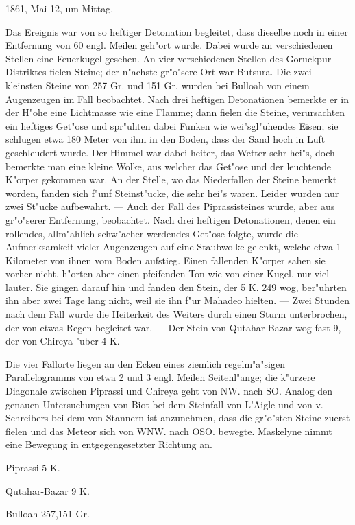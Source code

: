 \documentclass[a4paper, 11pt, oneside]{article}
\begin{document}
1861, Mai 12, um Mittag.

Das Ereignis war von so heftiger Detonation begleitet, dass dieselbe noch in einer Entfernung von 60 engl. Meilen geh"ort wurde. Dabei wurde an verschiedenen Stellen eine Feuerkugel gesehen. An vier verschiedenen Stellen des Goruckpur-Distriktes fielen Steine; der n"achste gr"o"sere Ort war Butsura. Die zwei kleinsten Steine von 257 Gr. und 151 Gr. wurden bei Bulloah von einem Augenzeugen im Fall beobachtet. Nach drei heftigen Detonationen bemerkte er in der H"ohe eine Lichtmasse wie eine Flamme; dann fielen die Steine, verursachten ein heftiges Get"ose und spr"uhten dabei Funken wie wei"sgl"uhendes Eisen; sie schlugen etwa 180 Meter von ihm in den Boden, dass der Sand hoch in Luft geschleudert wurde. Der Himmel war dabei heiter, das Wetter sehr hei"s, doch bemerkte man eine kleine Wolke, aus welcher das Get"ose und der leuchtende K"orper gekommen war. An der Stelle, wo das Niederfallen der Steine bemerkt worden, fanden sich f"unf Steinst"ucke, die sehr hei"s waren. Leider wurden nur zwei St"ucke aufbewahrt. --- Auch der Fall des Piprassisteines wurde, aber aus gr"o"serer Entfernung, beobachtet. Nach drei heftigen Detonationen, denen ein rollendes, allm"ahlich schw"acher werdendes Get"ose folgte, wurde die Aufmerksamkeit vieler Augenzeugen auf eine Staubwolke gelenkt, welche etwa 1 Kilometer von ihnen vom Boden aufstieg. Einen fallenden K"orper sahen sie vorher nicht, h"orten aber einen pfeifenden Ton wie von einer Kugel, nur viel lauter. Sie gingen darauf hin und fanden den Stein, der 5 K. 249 wog, ber"uhrten ihn aber zwei Tage lang nicht, weil sie ihn f"ur Mahadeo hielten. --- Zwei Stunden nach dem Fall wurde die Heiterkeit des Weiters durch einen Sturm unterbrochen, der von etwas Regen begleitet war. --- Der Stein von Qutahar Bazar wog fast 9, der von Chireya "uber 4 K.

Die vier Fallorte liegen an den Ecken eines ziemlich regelm"a"sigen Parallelogramms von etwa 2 und 3 engl. Meilen Seitenl"ange; die k"urzere Diagonale zwischen Piprassi und Chireya geht von NW. nach SO. Analog den genauen Untersuchungen von Biot bei dem Steinfall von L'Aigle und von v. Schreibers bei dem von Stannern ist anzunehmen, dass die gr"o"sten Steine zuerst fielen und das Meteor sich von WNW. nach OSO. bewegte. Maskelyne nimmt eine Bewegung in entgegengesetzter Richtung an.

Piprassi  
5 K.

Qutahar-Bazar  
9 K.

Bulloah  
257,151 Gr.
\end{document}
